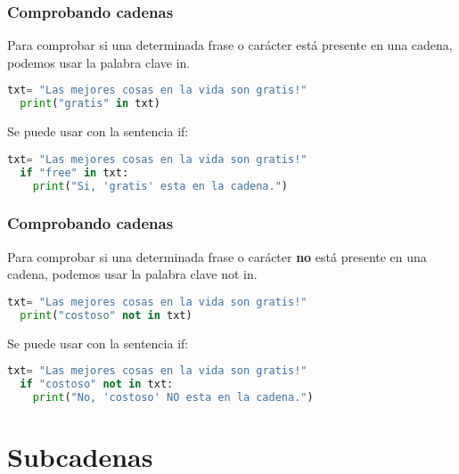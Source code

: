 \begin{frame}[fragile]
  \frametitle{Comprobando cadenas}

  Para comprobar si una determinada frase o carácter está presente
  en una cadena, podemos usar la palabra clave
  \textcolor{codeKeyword}{in}.

  \begin{lstlisting}[language=Python]
  txt= "Las mejores cosas en la vida son gratis!"
  print("gratis" in txt)
  \end{lstlisting}

  \pausa
  Se puede usar con la sentencia \textcolor{codeKeyword}{if}:

  \begin{lstlisting}[language=Python]
  txt= "Las mejores cosas en la vida son gratis!"
  if "free" in txt:
    print("Si, 'gratis' esta en la cadena.")
  \end{lstlisting}
\end{frame}

\begin{frame}[fragile]
  \frametitle{Comprobando cadenas}

  Para comprobar si una determinada frase o carácter \textbf{no} 
  está presente en una cadena, podemos usar la palabra clave
  \textcolor{codeKeyword}{not in}.

  \begin{lstlisting}[language=Python]
  txt= "Las mejores cosas en la vida son gratis!"
  print("costoso" not in txt)
  \end{lstlisting}

  \pausa
  Se puede usar con la sentencia \textcolor{codeKeyword}{if}:

  \begin{lstlisting}[language=Python]
  txt= "Las mejores cosas en la vida son gratis!"
  if "costoso" not in txt:
    print("No, 'costoso' NO esta en la cadena.")
  \end{lstlisting}
\end{frame}


\section{Subcadenas}

